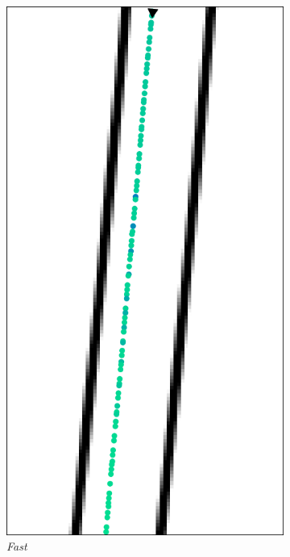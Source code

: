 \begin{figure}[H]
\begin{subfigure}[b]{0.29\textwidth}
        \centering
        \includegraphics[width=\textwidth]{images/monza_zoom_mpc_fast_speed.png}
        \caption{\textit{Fast}}
        \label{fig:fast_speed}
    \end{subfigure}
    \begin{subfigure}[b]{0.3805\textwidth}
        \centering

\end{subfigure}
\end{figure}
